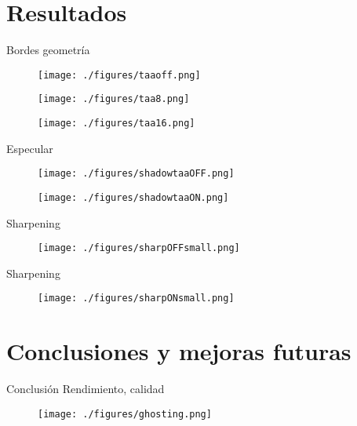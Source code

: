 \documentclass[table]{beamer}
\begin{document}
\section{Resultados}

\begin{frame}[fragile]{Bordes geometría}
    \begin{figure}
        \texttt{[image: ./figures/taaoff.png]}
    \end{figure}
    \begin{figure}
        \texttt{[image: ./figures/taa8.png]}
    \end{figure}
    \begin{figure}
        \texttt{[image: ./figures/taa16.png]}
    \end{figure}
\end{frame}

\begin{frame}[fragile]{Especular}
    \begin{figure}
        \texttt{[image: ./figures/shadowtaaOFF.png]}
    \end{figure}
    \begin{figure}
        \texttt{[image: ./figures/shadowtaaON.png]}
    \end{figure}
\end{frame}

\begin{frame}[fragile]{Sharpening}
    \begin{figure}
        \texttt{[image: ./figures/sharpOFFsmall.png]}
    \end{figure}
\end{frame}

\begin{frame}[fragile]{Sharpening}
    \begin{figure}
        \texttt{[image: ./figures/sharpONsmall.png]}
    \end{figure}
\end{frame}

\section{Conclusiones y mejoras futuras}

\begin{frame}[fragile]{Conclusión}
    Rendimiento, calidad
    \begin{figure}
        \texttt{[image: ./figures/ghosting.png]}
    \end{figure}
\end{frame}
\end{document}
